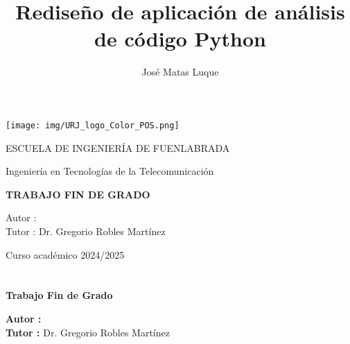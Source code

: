 \documentclass[a4paper, 12pt]{book}
\title{Rediseño de aplicación de análisis de código Python}
\author{ José Matas Luque}
\makeatletter
\let\thetitle\@title
\let\theauthor\@author
\makeatother
\begin{document}
\renewcommand{\refname}{Bibliografía}  %
\renewcommand{\appendixname}{Apéndice}



\begin{titlepage}
\begin{center}
\texttt{[image: img/URJ\_logo\_Color\_POS.png]}

\vspace{1.75cm}

\LARGE
ESCUELA DE INGENIERÍA DE FUENLABRADA
\vspace{1cm}

\LARGE
Ingeniería en Tecnologías de la Telecomunicación

\vspace{1cm}
\LARGE
\textbf{TRABAJO FIN DE GRADO}

\vspace{2cm}

\Large
\MakeUppercase{\thetitle}

\vspace{2cm}

\large
Autor : \theauthor \\
Tutor : Dr. Gregorio Robles Martínez\\
\vspace{1cm}

\large
Curso académico 2024/2025

\end{center}
\end{titlepage}

\newpage
\mbox{}
\thispagestyle{empty} %



\clearpage
{}
\chapter*{}

\vspace{-4cm}
\begin{center}
\LARGE
\textbf{Trabajo Fin de Grado}

\vspace{1cm}
\large
\thetitle

\vspace{0.8cm}
\large
\textbf{Autor :} \theauthor \\
\textbf{Tutor :} Dr. Gregorio Robles Martínez

\end{center}
\end{document}
